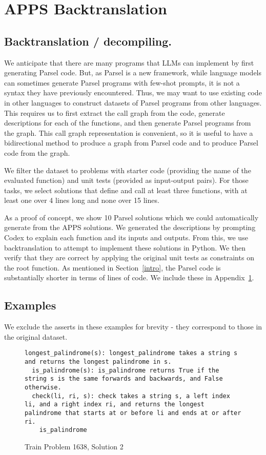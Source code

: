 \section{APPS Backtranslation}
\label{appendixbacktranslation}

\subsection{Backtranslation / decompiling.}
We anticipate that there are many programs that LLMs can implement by first generating Parsel code. But, as Parsel is a new framework, while language models can sometimes generate Parsel programs with few-shot prompts, it is not a syntax they have previously encountered. Thus, we may want to use existing code in other languages to construct datasets of Parsel programs from other languages. This requires us to first extract the call graph from the code, generate descriptions for each of the functions, and then generate Parsel programs from the graph. This call graph representation is convenient, so it is useful to have a bidirectional method to produce a graph from Parsel code and to produce Parsel code from the graph.

We filter the dataset to problems with starter code (providing the name of the evaluated function) and unit tests (provided as input-output pairs). For those tasks, we select solutions that define and call at least three functions, with at least one over 4 lines long and none over 15 lines. 

As a proof of concept, we show 10 Parsel solutions which we could automatically generate from the APPS solutions. We generated the descriptions by prompting Codex to explain each function and its inputs and outputs. From this, we use backtranslation to attempt to implement these solutions in Python. We then verify that they are correct by applying the original unit tests as constraints on the root function. As mentioned in Section~\ref{intro}, the Parsel code is substantially shorter in terms of lines of code. We include these in Appendix~\ref{appendixbacktranslation}.

\subsection{Examples}
We exclude the asserts in these examples for brevity - they correspond to those in the original dataset.

\begin{figure*}[h]
\begin{lstlisting}
longest_palindrome(s): longest_palindrome takes a string s and returns the longest palindrome in s.
  is_palindrome(s): is_palindrome returns True if the string s is the same forwards and backwards, and False otherwise.
  check(li, ri, s): check takes a string s, a left index li, and a right index ri, and returns the longest palindrome that starts at or before li and ends at or after ri.
    is_palindrome
\end{lstlisting}
\caption{Train Problem 1638, Solution 2}
\end{figure*}

